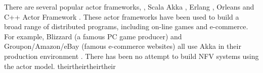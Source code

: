There are several popular actor frameworks, \ie, Scala Akka \cite{akka}, Erlang
\cite{erlang}, Orleans \cite{Orleans} and C++ Actor Framework \cite{caf}. These
actor frameworks have been used to build a broad range of distributed programs,
including on-line games and e-commerce. For example, Blizzard (a famous PC game
producer) and Groupon/Amazon/eBay (famous e-commerce websites) all use Akka in
their production environment \cite{akka}. There has been no attempt to build NFV systems using the actor model.
theirtheirtheirtheir                                                            

